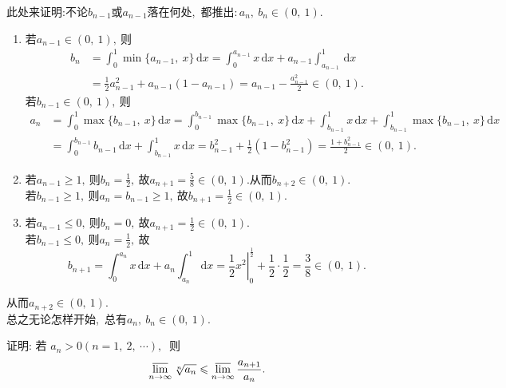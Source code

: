 \begin{note}
	此处来证明:不论$b_{n-1}$或$a_{n-1}$落在何处,\ 都推出$:a_n,\ b_n\in(0,\ 1).$
	\begin{enumerate}
		\item 若$a_{n-1}\in(0,\ 1),\ $则
		$$\begin{aligned}
			b_n&=\int_{0}^{1}\min\{a_{n-1},\ x\}\,\mathrm{d}x=\int_{0}^{a_{n-1}}x\,\mathrm{d}x+a_{n-1}\int_{a_{n-1}}^{1}\,\mathrm{d}x\\
			&=\frac{1}{2}a_{n-1}^2+a_{n-1}(1-a_{n-1})=a_{n-1}-\frac{a_{n-1}^2}{2}\in(0,\ 1).
		\end{aligned}$$
		若$b_{n-1}\in(0,\ 1),\ $则
		$$\begin{aligned}
			a_n&=\int_{0}^{1}\max\{b_{n-1},\ x\}\,\mathrm{d}x=\int_{0}^{b_{n-1}}\max\{b_{n-1},\ x\}\,\mathrm{d}x+\int_{b_{n-1}}^{1}x\,\mathrm{d}x+\int_{b_{n-1}}^{1}\max\{b_{n-1},\ x\}\,\mathrm{d}x\\
			&=\int_{0}^{b_{n-1}}b_{n-1}\,\mathrm{d}x+\int_{b_{n-1}}^{1}x\,\mathrm{d}x=b_{n-1}^2+\frac{1}{2}(1-b_{n-1}^2)=\frac{1+b_{n-1}^2}{2}\in(0,\ 1).
		\end{aligned}$$
		\item 若$a_{n-1}\geqslant 1,\ $则$b_n=\frac{1}{2},\ $故$a_{n+1}=\frac{5}{8}\in(0,\ 1).$从而$b_{n+2}\in(0,\ 1).$\\
		若$b_{n-1}\geqslant 1,\ $则$a_n=b_{n-1}\geqslant 1,\ $故$b_{n+1}=\frac{1}{2}\in(0,\ 1).$
		\item 若$a_{n-1}\leqslant 0,\ $则$b_n=0,\ $故$a_{n+1}=\frac{1}{2}\in(0,\ 1).$\\
		若$b_{n-1}\leqslant 0,\ $则$a_n=\frac{1}{2},\ $故
		$$b_{n+1}=\int_{0}^{a_n}x\,\mathrm{d}x+a_n\int_{a_n}^{1}\,\mathrm{d}x=\left.\frac{1}{2}x^2\right|_0^{\frac{1}{2}}+\frac{1}{2}\cdot\frac{1}{2}=\frac{3}{8}\in(0,\ 1).$$
	\end{enumerate}
	从而$a_{n+2}\in(0,\ 1).$\\
	总之无论怎样开始,\ 总有$a_n,\ b_n\in(0,\ 1).$
\end{note}
\newpage
\begin{problem}
	证明: 若  $a_{n}>0(n=1,\ 2,\  \cdots) ,\ $ 则
	$$\varlimsup_{n \rightarrow \infty} \sqrt[n]{a_{n}} \leqslant \varlimsup_{n \rightarrow \infty} \frac{a_{n+1}}{a_{n}} .$$
\end{problem}
